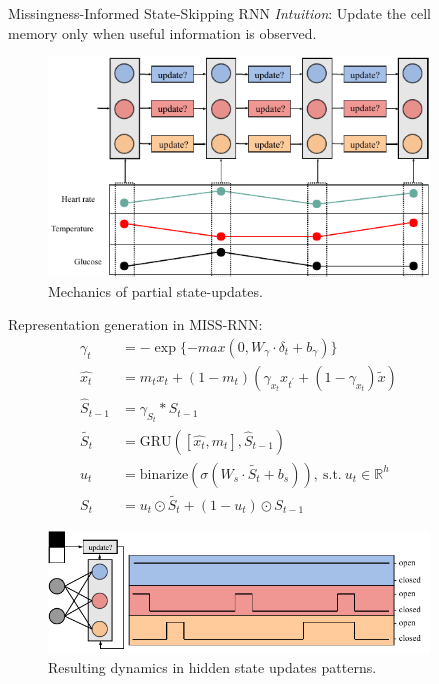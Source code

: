 \documentclass[final, 18pt]{beamer}
\newlength{\sepwid}
\newlength{\onecolwid}
\begin{document}
\begin{frame}
\begin{columns}[t]
\begin{column}{\onecolwid}
\end{column} %

\begin{column}{\sepwid}\end{column}

\begin{column}{\onecolwid}

\begin{alertblock}{\centering Missingness-Informed State-Skipping RNN}
\textit{Intuition}: Update the cell memory only when useful information is observed.

\begin{figure}
    \centering
    \includegraphics[width=.9\onecolwid]{img/MISS_mechanics.pdf}
    \caption{Mechanics of partial state-updates.}
\end{figure}

Representation generation in MISS-RNN:
\begin{align*}
    \gamma_t &= -\exp\{-max(0, W_\gamma\cdot\delta_t + b_\gamma)\} \\
    \hat{x_t} &= m_t x_t + (1-m_t)(\gamma_{x_t} x_{t^\prime} + (1-\gamma_{x_t})\tilde{x})\\
    \hat{S}_{t-1} &= \gamma_{S_t}*S_{t-1}\\
    \tilde{S_t} &= \text{GRU}([\hat{x_t}, m_t], \hat{S}_{t-1})\\
    u_t &= \text{binarize}(\sigma(W_s\cdot \tilde{S_t} + b_s)),\ \text{s.t.}\ u_t \in \mathbb{R}^h\\
    S_t &=  u_t \odot \tilde{S_t} + (1-u_t) \odot S_{t-1}
\end{align*}

\vspace{0.5cm}
\begin{figure}
    \centering
    \includegraphics[width=.9\onecolwid]{img/MISS_effect.pdf}
    \caption{Resulting dynamics in hidden state updates patterns.}
\end{figure}


\end{alertblock}
\end{column}
\end{columns}
\end{frame}
\end{document}
